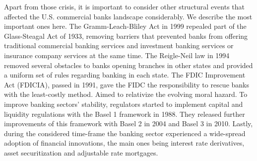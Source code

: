 \documentclass[12pt, a4paper]{article} %
\begin{document}
Apart from those crisis, it is important to consider other structural events that affected the U.S. commercial banks landscape considerably. We describe the most important ones here. 
The Gramm-Leach-Bliley Act in 1999 repealed part of the Glass-Steagal Act of 1933, removing barriers that prevented banks from offering traditional commercial banking services and investment banking services or insurance company services at the same time.  
The Reigle-Neil law in 1994 removed several obstacles to banks opening branches in other states and provided a uniform set of rules regarding banking in each state.
The FDIC Improvement Act (FDICIA), passed in 1991, gave the FIDC the responsibility to rescue banks with the least-costly method. Aimed to relativize the evolving moral hazard. To improve banking sectors' stability, regulators started to implement capital and liquidity regulations with the Basel 1 framework in 1988. They released further improvements of this framework with Basel 2 in 2004 and Basel 3 in 2010. Lastly, during the considered time-frame the banking sector experienced a wide-spread adoption of financial innovations, the main ones being interest rate derivatives, asset securitization and adjustable rate mortgages. 

\end{document}
